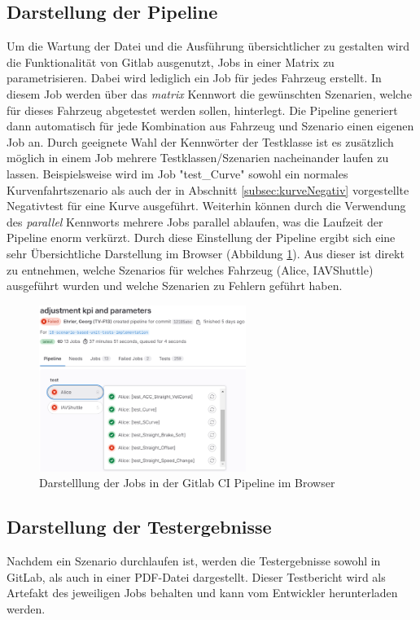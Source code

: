 \subsection{Darstellung der Pipeline}
Um die Wartung der Datei und die Ausführung übersichtlicher zu gestalten wird die Funktionalität von Gitlab ausgenutzt, Jobs in einer Matrix zu parametrisieren. Dabei wird lediglich ein Job für jedes Fahrzeug erstellt. In diesem Job werden über das \textit{matrix} Kennwort die gewünschten Szenarien, welche für dieses Fahrzeug abgetestet werden sollen, hinterlegt. Die Pipeline generiert dann automatisch für jede Kombination aus Fahrzeug und Szenario einen eigenen Job an. Durch geeignete Wahl der Kennwörter der Testklasse ist es zusätzlich möglich in einem Job mehrere Testklassen/Szenarien nacheinander laufen zu lassen. Beispielsweise wird im Job "test\_Curve" sowohl ein normales Kurvenfahrtszenario als auch der in Abschnitt \ref{subsec:kurveNegativ} vorgestellte Negativtest für eine Kurve ausgeführt. Weiterhin können durch die Verwendung des \textit{parallel} Kennworts mehrere Jobs parallel ablaufen, was die Laufzeit der Pipeline enorm verkürzt. Durch diese Einstellung der Pipeline ergibt sich eine sehr Übersichtliche Darstellung im Browser (Abbildung \ref{fig:uebersicht_pipeline}). Aus dieser ist direkt zu entnehmen, welche Szenarios für welches Fahrzeug (Alice, IAVShuttle) ausgeführt wurden und welche Szenarien zu Fehlern geführt haben.
\begin{figure}[ht]
    \centering
    \includegraphics[width=0.6\textwidth]{figures/3_Implementierung/uebersicht_pipeline.png}
    \caption{Darstelllung der Jobs in der Gitlab CI Pipeline im Browser}
    \label{fig:uebersicht_pipeline}
\end{figure}

\subsection{Darstellung der Testergebnisse}
Nachdem ein Szenario durchlaufen ist, werden die Testergebnisse sowohl in GitLab, als auch in einer PDF-Datei dargestellt. Dieser Testbericht wird als Artefakt des jeweiligen Jobs behalten und kann vom Entwickler herunterladen werden.


